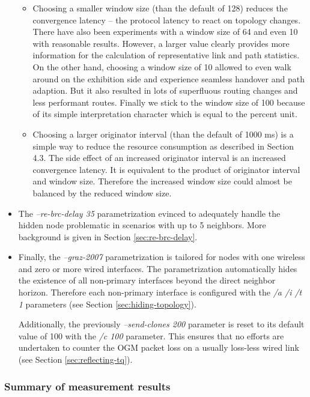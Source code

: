\documentclass[11pt]{article}
\begin{document}
\begin{itemize}
\begin{itemize}
  \item Choosing a smaller window size (than the default of 128) reduces the convergence latency -- the protocol latency to react on topology changes. There have also been experiments with a window size of 64 and even 10 with reasonable results. However, a larger value clearly provides more information for the calculation of representative link and path statistics. On the other hand, choosing a window size of 10 allowed to even walk around on the exhibition side and experience seamless handover and path adaption. But it also resulted in lots of superfluous routing changes and less performant routes. Finally we stick to the window size of 100 because of its simple interpretation character which is equal to the percent unit.


  \item Choosing a larger originator interval (than the default of 1000 ms) is a simple way to reduce the resource consumption as described in \cite{batman-status-report} Section 4.3. The side effect of an increased originator interval is an increased convergence latency. It is equivalent to the product of originator interval and window size. Therefore the increased window size could almost be balanced by the reduced window size.

\end{itemize}

\item The \emph{--re-brc-delay 35} parametrization evinced to adequately handle the hidden node problematic in scenarios with up to 5 neighbors. More background is given in Section \ref{sec:re-brc-delay}.

\item Finally, the \emph{--graz-2007} parametrization is tailored for nodes with one wireless and zero or more wired interfaces. The parametrization automatically hides the existence of all non-primary interfaces beyond the direct neighbor horizon. Therefore each non-primary interface is configured with the \emph{/a /i /t 1} parameters (see Section \ref{sec:hiding-topology}).

 Additionally, the previously \emph{--send-clones 200} parameter is reset to its default value of 100 with the \emph{/c 100} parameter. This ensures that no efforts are undertaken to counter the OGM packet loss on a usually loss-less wired link (see Section \ref{sec:reflecting-tq}).

\end{itemize}


\subsubsection{Summary of measurement results}
\label{sec:graz-2007-summary}
\end{document}
